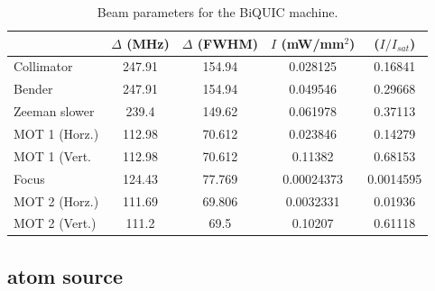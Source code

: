 \begin{table}
\centering
\begin{tabular}{l c c c c}
\hline
   		& $\Delta$ (MHz) & $\Delta$ (FWHM)  &  $I$ (mW/mm$^2$)  &  ($I/I_{sat}$)\\
 \hline\hline
    Collimator & 247.91 & 154.94 & 0.028125 & 0.16841\\
    Bender & 247.91 & 154.94 & 0.049546 & 0.29668\\
    Zeeman slower & 239.4 & 149.62 & 0.061978 & 0.37113\\
    MOT 1 (Horz.) & 112.98 & 70.612 & 0.023846 & 0.14279\\
    MOT 1 (Vert. & 112.98 & 70.612 & 0.11382 & 0.68153\\
    Focus & 124.43 & 77.769 & 0.00024373 & 0.0014595\\
    MOT 2 (Horz.) & 111.69 & 69.806 & 0.0032331 & 0.01936\\
    MOT 2 (Vert.) & 111.2 & 69.5 & 0.10207 & 0.61118\\
\hline
\end{tabular}
\caption{Beam parameters for the BiQUIC machine. }
\label{tab:biquic_beams}
\end{table}









	
	


\subsection*{\mhe atom source}

